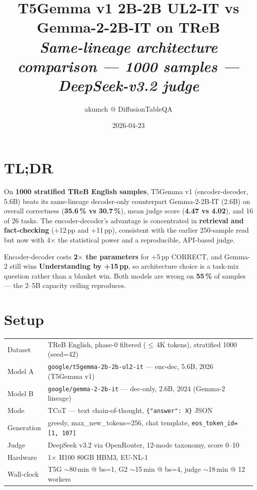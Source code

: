 \documentclass[11pt]{article}
\title{\vspace{-2em}\textbf{T5Gemma v1 2B-2B UL2-IT vs Gemma-2-2B-IT on TReB}\\
\vspace{0.2em}\large{\normalfont\itshape Same-lineage architecture comparison --- 1000 samples --- DeepSeek-v3.2 judge}}
\author{\small akumch @ DiffusionTableQA}
\date{\small 2026-04-23}
\begin{document}
\maketitle
\vspace{-1.5em}

\section*{TL;DR}

On \textbf{1000 stratified TReB English samples}, T5Gemma v1 (encoder-decoder,
5.6B) beats its same-lineage decoder-only counterpart Gemma-2-2B-IT (2.6B) on
overall correctness (\textbf{35.6\,\% vs 30.7\,\%}), mean judge score
(\textbf{4.47 vs 4.02}), and 16 of 26 tasks. The encoder-decoder's advantage is
concentrated in \textbf{retrieval and fact-checking} (+12\,pp and +11\,pp),
consistent with the earlier 250-sample read but now with 4$\times$ the
statistical power and a reproducible, API-based judge.

Encoder-decoder costs \textbf{2$\times$ the parameters} for +5\,pp CORRECT,
and Gemma-2 still wins \textbf{Understanding by +15\,pp}, so architecture
choice is a task-mix question rather than a blanket win. Both models are
wrong on \textbf{55\,\%} of samples --- the 2--5B capacity ceiling reproduces.

\section*{Setup}

\begin{tabular}{@{}ll@{}}
\toprule
Dataset & TReB English, phase-0 filtered ($\leq$\,4K tokens), stratified 1000 (seed=42) \\
Model A & \texttt{google/t5gemma-2b-2b-ul2-it} --- enc-dec, 5.6B, 2026 (T5Gemma v1) \\
Model B & \texttt{google/gemma-2-2b-it} --- dec-only, 2.6B, 2024 (Gemma-2 lineage) \\
Mode & TCoT --- text chain-of-thought, \texttt{\{"answer": X\}} JSON \\
Generation & greedy, max\_new\_tokens=256, chat template, \texttt{eos\_token\_id=[1,\,107]} \\
Judge & DeepSeek v3.2 via OpenRouter, 12-mode taxonomy, score 0--10 \\
Hardware & 1$\times$ H100 80GB HBM3, EU-NL-1 \\
Wall-clock & T5G $\sim$80\,min @ bs=1, G2 $\sim$15\,min @ bs=4, judge $\sim$18\,min @ 12 workers \\
\bottomrule
\end{tabular}
\end{document}
